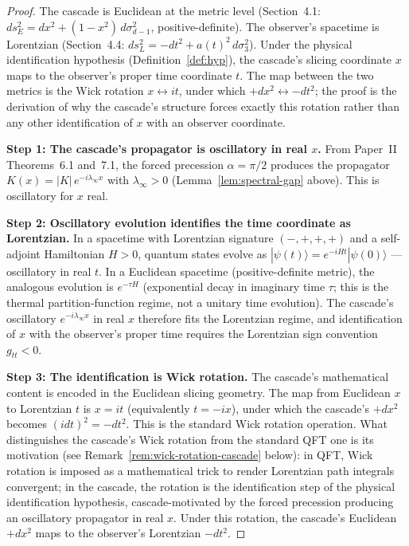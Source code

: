 \documentclass[12pt,a4paper]{article}
\begin{document}
\begin{proof}
The cascade is Euclidean at the metric level (Section~4.1:
$ds^2_E = dx^2 + (1-x^2)\,d\sigma_{d-1}^2$, positive-definite). The
observer's spacetime is Lorentzian (Section~4.4:
$ds^2_L = -dt^2 + a(t)^2\,d\sigma_3^2$). Under the physical
identification hypothesis (Definition~\ref{def:hyp}), the cascade's
slicing coordinate $x$ maps to the observer's proper time coordinate
$t$. The map between the two metrics is the Wick rotation
$x \leftrightarrow it$, under which $+dx^2 \leftrightarrow -dt^2$; the
proof is the derivation of why the cascade's structure forces exactly
this rotation rather than any other identification of $x$ with an
observer coordinate.

\textbf{Step 1: The cascade's propagator is oscillatory in real $x$.}
From Paper~II~\cite{part2} Theorems~6.1 and~7.1, the forced precession
$\alpha = \pi/2$ produces the propagator
$K(x) = |K|\,e^{-i\lambda_\infty x}$ with $\lambda_\infty > 0$
(Lemma~\ref{lem:spectral-gap} above). This is oscillatory for $x$ real.

\textbf{Step 2: Oscillatory evolution identifies the time coordinate as Lorentzian.}
In a spacetime with Lorentzian signature $(-,+,+,+)$ and a self-adjoint
Hamiltonian $H > 0$, quantum states evolve as
$|\psi(t)\rangle = e^{-iHt}|\psi(0)\rangle$ --- oscillatory in real $t$.
In a Euclidean spacetime (positive-definite metric), the analogous
evolution is $e^{-\tau H}$ (exponential decay in imaginary time $\tau$;
this is the thermal partition-function regime, not a unitary time
evolution). The cascade's oscillatory $e^{-i\lambda_\infty x}$ in real
$x$ therefore fits the Lorentzian regime, and identification of $x$
with the observer's proper time requires the Lorentzian sign
convention $g_{tt} < 0$.

\textbf{Step 3: The identification is Wick rotation.}
The cascade's mathematical content is encoded in the Euclidean slicing
geometry. The map from Euclidean $x$ to Lorentzian $t$ is
$x = it$ (equivalently $t = -ix$), under which the cascade's
$+dx^2$ becomes $(idt)^2 = -dt^2$. This is the standard Wick rotation
operation. What distinguishes the cascade's Wick rotation from the
standard QFT one is its motivation (see
Remark~\ref{rem:wick-rotation-cascade} below): in QFT, Wick rotation
is imposed as a mathematical trick to render Lorentzian path integrals
convergent; in the cascade, the rotation is the identification step of
the physical identification hypothesis, cascade-motivated by the
forced precession producing an oscillatory propagator in real $x$.
Under this rotation, the cascade's Euclidean $+dx^2$ maps to the
observer's Lorentzian $-dt^2$.


\end{proof}
\end{document}
